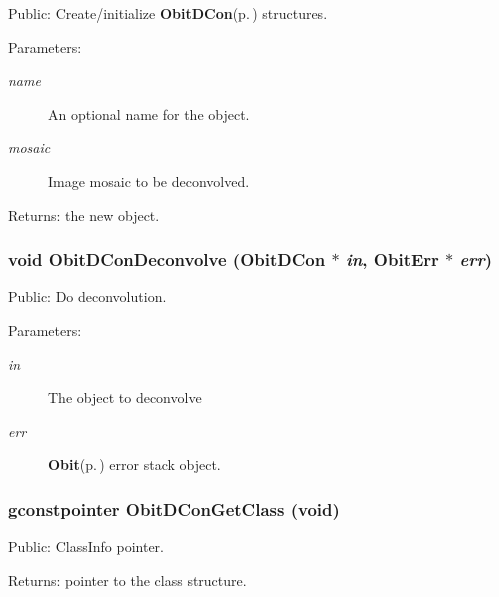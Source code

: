 Public: Create/initialize {\bf Obit\-DCon}{\rm (p.\,\pageref{structObitDCon})} structures. 

\begin{Desc}
\item[Parameters:]
\begin{description}
\item[{\em name}]An optional name for the object. \item[{\em mosaic}]Image mosaic to be deconvolved. \end{description}
\end{Desc}
\begin{Desc}
\item[Returns:]the new object. \end{Desc}
\subsubsection{\setlength{\rightskip}{0pt plus 5cm}void Obit\-DCon\-Deconvolve ({\bf Obit\-DCon} $\ast$ {\em in}, {\bf Obit\-Err} $\ast$ {\em err})}\label{ObitDCon_8c_a12}


Public: Do deconvolution. 

\begin{Desc}
\item[Parameters:]
\begin{description}
\item[{\em in}]The object to deconvolve \item[{\em err}]{\bf Obit}{\rm (p.\,\pageref{structObit})} error stack object. \end{description}
\end{Desc}
\subsubsection{\setlength{\rightskip}{0pt plus 5cm}gconstpointer Obit\-DCon\-Get\-Class (void)}\label{ObitDCon_8c_a7}


Public: Class\-Info pointer. 

\begin{Desc}
\item[Returns:]pointer to the class structure. \end{Desc}
